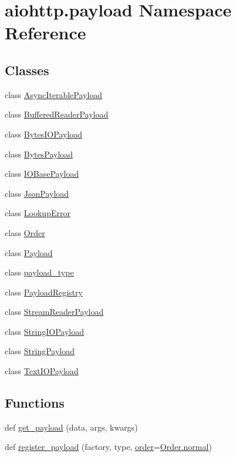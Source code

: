 \hypertarget{namespaceaiohttp_1_1payload}{}\section{aiohttp.\+payload Namespace Reference}
\label{namespaceaiohttp_1_1payload}
\subsection*{Classes}
\begin{DoxyCompactItemize}
\item 
class \hyperlink{classaiohttp_1_1payload_1_1_async_iterable_payload}{Async\+Iterable\+Payload}
\item 
class \hyperlink{classaiohttp_1_1payload_1_1_buffered_reader_payload}{Buffered\+Reader\+Payload}
\item 
class \hyperlink{classaiohttp_1_1payload_1_1_bytes_i_o_payload}{Bytes\+I\+O\+Payload}
\item 
class \hyperlink{classaiohttp_1_1payload_1_1_bytes_payload}{Bytes\+Payload}
\item 
class \hyperlink{classaiohttp_1_1payload_1_1_i_o_base_payload}{I\+O\+Base\+Payload}
\item 
class \hyperlink{classaiohttp_1_1payload_1_1_json_payload}{Json\+Payload}
\item 
class \hyperlink{classaiohttp_1_1payload_1_1_lookup_error}{Lookup\+Error}
\item 
class \hyperlink{classaiohttp_1_1payload_1_1_order}{Order}
\item 
class \hyperlink{classaiohttp_1_1payload_1_1_payload}{Payload}
\item 
class \hyperlink{classaiohttp_1_1payload_1_1payload__type}{payload\+\_\+type}
\item 
class \hyperlink{classaiohttp_1_1payload_1_1_payload_registry}{Payload\+Registry}
\item 
class \hyperlink{classaiohttp_1_1payload_1_1_stream_reader_payload}{Stream\+Reader\+Payload}
\item 
class \hyperlink{classaiohttp_1_1payload_1_1_string_i_o_payload}{String\+I\+O\+Payload}
\item 
class \hyperlink{classaiohttp_1_1payload_1_1_string_payload}{String\+Payload}
\item 
class \hyperlink{classaiohttp_1_1payload_1_1_text_i_o_payload}{Text\+I\+O\+Payload}
\end{DoxyCompactItemize}
\subsection*{Functions}
\begin{DoxyCompactItemize}
\item 
def \hyperlink{namespaceaiohttp_1_1payload_aaf2b9d72259fa164adccd57d1e85a929}{get\+\_\+payload} (data, args, kwargs)
\item 
def \hyperlink{namespaceaiohttp_1_1payload_a8e1cde3bc348f6270d7e5598c572b90d}{register\+\_\+payload} (factory, type, \hyperlink{namespaceaiohttp_1_1payload_a0e481169b45d7b468717dd82dd2b3712}{order}=\hyperlink{classaiohttp_1_1payload_1_1_order_a8f21d15654d7e3547ad88d35a907c921}{Order.\+normal})
\end{DoxyCompactItemize}
